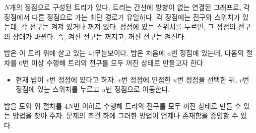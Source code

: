$N$개의 정점으로 구성된 트리가 있다. 트리는 간선에 방향이 없는 연결된 그래프로, 각 정점에서 다른 정점으로 가는 최단 경로가 유일하다. 각 정점에는 전구와 스위치가 있는데, 각 전구는 켜져 있거나 꺼져 있다. 정점에 있는 스위치를 누르면, 그 정점의 전구의 상태가 바뀐다. 즉, 켜진 전구는 꺼지고, 꺼진 전구는 켜진다.

밥은 이 트리 위에 살고 있는 나무늘보이다. 밥은 처음에 $a$번 정점에 있는데, 다음의 절차를 $0$번 이상 수행해 트리의 전구를 모두 꺼진 상태로 만들고자 한다.

\begin{itemize}
  \item 현재 밥이 $v$번 정점에 있다고 하자. $v$번 정점에 인접한 $u$번 정점을 선택한 뒤, $v$번 정점에 있는 스위치를 누르고 $u$번 정점으로 이동한다.
\end{itemize}

밥을 도와 위 절차를 $4N$번 이하로 수행해 트리의 전구를 모두 꺼진 상태로 만들 수 있는 방법을 찾아 주자. 문제의 조건 하에 그러한 방법이 언제나 존재함을 증명할 수 있다.
